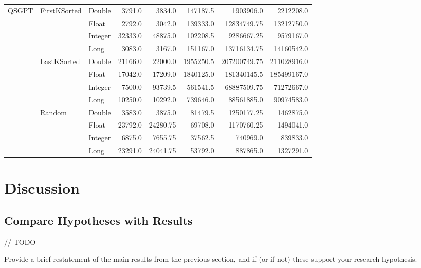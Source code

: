 \documentclass[unicode,11pt,a4paper,oneside,numbers=endperiod,openany]{scrartcl}
\begin{document}
\begin{center}
\begin{longtable}{|l|l|l|r|r|r|r|r|}
            \multirow{12}{*}{QSGPT} & \multirow{4}{*}{FirstKSorted} & Double & 3791.0 & 3834.0 & 147187.5 & 1903906.0 & 2212208.0 \\
            & & Float & 2792.0 & 3042.0 & 139333.0 & 12834749.75 & 13212750.0 \\
            & & Integer & 32333.0 & 48875.0 & 102208.5 & 9286667.25 & 9579167.0 \\
            & & Long & 3083.0 & 3167.0 & 151167.0 & 13716134.75 & 14160542.0 \\
            \cline{2-8}
            & \multirow{4}{*}{LastKSorted} & Double & 21166.0 & 22000.0 & 1955250.5 & 207200749.75 & 211028916.0 \\
            & & Float & 17042.0 & 17209.0 & 1840125.0 & 181340145.5 & 185499167.0 \\
            & & Integer & 7500.0 & 93739.5 & 561541.5 & 68887509.75 & 71272667.0 \\
            & & Long & 10250.0 & 10292.0 & 739646.0 & 88561885.0 & 90974583.0 \\
            \cline{2-8}
            & \multirow{4}{*}{Random} & Double & 3583.0 & 3875.0 & 81479.5 & 1250177.25 & 1462875.0 \\
            & & Float & 23792.0 & 24280.75 & 69708.0 & 1170760.25 & 1494041.0 \\
            & & Integer & 6875.0 & 7655.75 & 37562.5 & 740969.0 & 839833.0 \\
            & & Long & 23291.0 & 24041.75 & 53792.0 & 887865.0 & 1327291.0 \\
            \hline
    
        \end{longtable}
    \end{center}



\section{Discussion}

    \subsection{Compare Hypotheses with Results}

    // TODO

    Provide a brief restatement of the main results from the previous section, and if (or if not) these support your research hypothesis.\\
\end{document}
